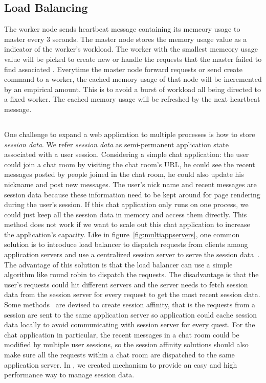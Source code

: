 \subsection{Load Balancing}
The worker node sends heartbeat message containing its memeory usage to master every 3 seconds.
The master node stores the memory usage value as a indicator of the worker's workload.
The worker with the smallest memeory usage value will be picked to create new \appins{} or
handle the requests that the master failed to find associated \appins{}.
Everytime the master node forward requests or send create \appins{} command to a worker,
the cached memory usage of that node will be incremented by an empirical amount.
This is to avoid a burst of workload all being directed to a fixed worker.
The cached memory usage will be refreshed by the next heartbeat message.



\subsection{\appins{}}
\label{sec:appins}
One challenge to expand a web application to multiple processes is 
how to store \emph{session data}.
We refer \emph{session data} as semi-permanent
application state associated with a user session. 
Considering a simple chat application:
the user could join a chat room by visiting the chat room's URL,
he could see the recent messages posted by people joined in the chat room,
he could also update his nickname and post new messages.
The user's nick name and recent messages are session data
because these information need to be kept around for page rendering 
during the user's session.
If this chat application only runs on one process,
we could just keep all the session data in memory and access 
them directly.
This method does not work
if we want to scale out this chat application to increase the application's capacity.
Like in figure~\ref{fig:multiappservers}, 
one common solution is to introduce load balancer to dispatch
requests from clients among application servers and
use a centralized session server to serve the session data~\cite{j2eedoc,chlan2002internet,chiang2001transparent,saigo2003session}.
The advantage of this solution is that the load balancer can use
a simple algorithm like round robin to dispatch the requests.
The disadvantage is that the user's requests could hit different 
servers and the server needs to fetch session data from the session server
for every request to get the most recent session data.
Some methods~\cite{shachor2005maintaining} are devised to create session affinity,
that is the requests from a session are sent to the same application 
server so application could cache session data locally to avoid communicating with
session server for every quest.
For the chat application in particular, 
the recent messages in a chat room could be modified by multiple user sessions,
so the session affinity solutions should also make sure all the requests within
a chat room are dispatched to the same application server.
In \cb{}, we created \appins{} mechanism to provide an easy and high performance
way to manage session data.

